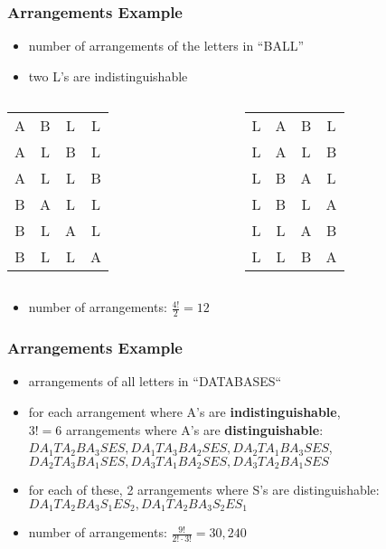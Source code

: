 \documentclass[dvipsnames]{beamer}
\begin{document}
\begin{frame}
  \frametitle{Arrangements Example}

  \begin{itemize}
    \item number of arrangements of the letters in ``BALL''
    \item two L's are indistinguishable
  \end{itemize}

  \begin{columns}[t]
    \begin{tabular}{c c c c}
A & B & L & L\\
A & L & B & L\\
A & L & L & B\\
B & A & L & L\\
B & L & A & L\\
B & L & L & A
    \end{tabular}

    \begin{tabular}{c c c c}
L & A & B & L\\
L & A & L & B\\
L & B & A & L\\
L & B & L & A\\
L & L & A & B\\
L & L & B & A
    \end{tabular}
  \end{columns}

  \pause
  \medskip
  \begin{itemize}
    \item number of arrangements: $\frac{4!}{2} = 12$
  \end{itemize}
\end{frame}

\begin{frame}
  \frametitle{Arrangements Example}

  \begin{itemize}
    \item arrangements of all letters in ``DATABASES``

    \pause
    \medskip
    \item for each arrangement where A's are \textbf{indistinguishable},\\
      $3! = 6$ arrangements where A's are \textbf{distinguishable}:\\
      \smallskip
      $DA_{1}TA_{2}BA_{3}SES,DA_{1}TA_{3}BA_{2}SES, DA_{2}TA_{1}BA_{3}SES$,\\
      $DA_{2}TA_{3}BA_{1}SES, DA_{3}TA_{1}BA_{2}SES, DA_{3}TA_{2}BA_{1}SES$

    \pause
    \smallskip
    \item for each of these, 2 arrangements where S's are distinguishable:\\
      \smallskip
      $DA_{1}TA_{2}BA_{3}S_{1}ES_{2},DA_{1}TA_{2}BA_{3}S_{2}ES_{1}$

    \pause
    \medskip
    \item number of arrangements: $\frac{9!}{2! \cdot 3!} = 30,240$
  \end{itemize}
\end{frame}
\end{document}
